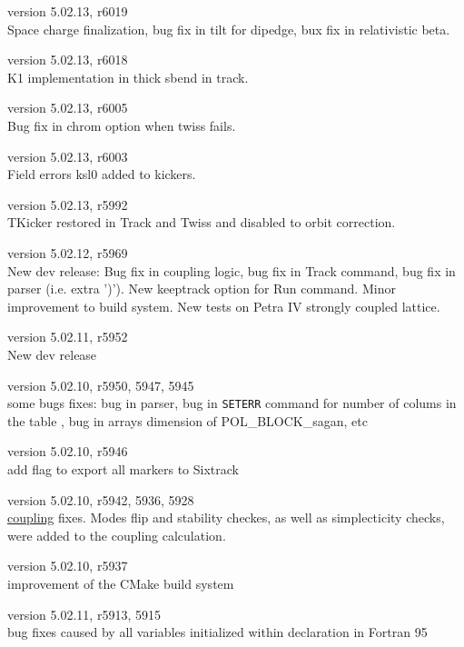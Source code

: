 \begin{madlist}
   version 5.02.13, r6019 \\
  Space charge finalization, bug fix in tilt for dipedge, bux fix in relativistic beta.

   version 5.02.13, r6018 \\
  K1 implementation in thick sbend in track.

   version 5.02.13, r6005 \\
  Bug fix in chrom option when twiss fails.

   version 5.02.13, r6003 \\
  Field errors ksl0 added to kickers.

   version 5.02.13, r5992 \\
  TKicker restored in Track and Twiss and disabled to orbit correction.

   version 5.02.12, r5969 \\
  New dev release: Bug fix in coupling logic, bug fix in Track command, bug fix in parser (i.e. extra ')'). New keeptrack option for Run command. Minor improvement to build system. New tests on Petra IV strongly coupled lattice.

   version 5.02.11, r5952 \\
  New dev release

   version 5.02.10, r5950, 5947, 5945\\
    some bugs fixes: bug in parser, bug in \texttt{SETERR} command for number of colums in the table , bug in arrays dimension of POL\_BLOCK\_sagan, etc 

   version 5.02.10, r5946 \\
   add flag to export all markers to Sixtrack

   version 5.02.10, r5942, 5936, 5928 \\
    \hyperref[sec:coupling]{coupling} fixes. Modes flip and stability checkes, as well as simplecticity checks, were added to the coupling calculation.  
  
   version 5.02.10, r5937 \\
    improvement of the CMake build system 
  
  version 5.02.11, r5913, 5915\\
    bug fixes caused by all variables initialized within declaration in Fortran 95 


\end{madlist}
